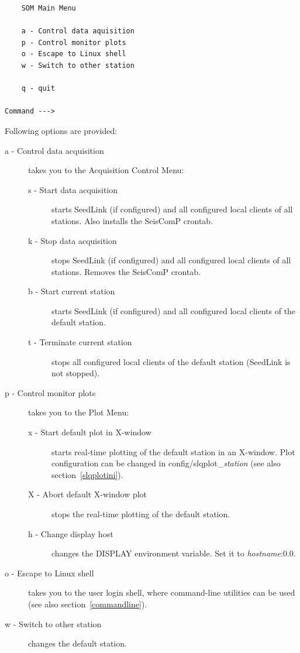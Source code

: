 \documentclass[11pt,a4paper,titlepage]{article}
\begin{document}
\begin{verbatim}
    SOM Main Menu
    
    a - Control data aquisition
    p - Control monitor plots
    o - Escape to Linux shell
    w - Switch to other station

    q - quit
    
Command --->
\end{verbatim}

Following options are provided:
\begin{description}
\item[a - Control data acquisition] takes you to the Acquisition Control Menu:

\begin{description}
\item[s - Start data acquisition] starts SeedLink (if configured) and all
configured local clients of all stations. Also installs the SeisComP crontab.

\item[k - Stop data acquisition] stops SeedLink (if configured) and all
configured local clients of all stations. Removes the SeisComP crontab.

\item[b - Start current station] starts SeedLink (if configured) and all
configured local clients of the default station.

\item[t - Terminate current station] stops all configured local
clients of the default station (SeedLink is not stopped).
\end{description}

\item[p - Control monitor plots] takes you to the Plot Menu:

\begin{description}
\item[x - Start default plot in X-window] starts real-time plotting of
the default station in an X-window. Plot configuration can be changed
in config/slqplot\_\textit{station} (see also section~\ref{slqplotini}).

\item[X - Abort default X-window plot] stops the real-time plotting of
the default station.

\item[h - Change display host] changes the DISPLAY environment variable.
Set it to \textit{hostname}:0.0.
\end{description}

\item[o - Escape to Linux shell] takes you to the user login shell, where
command-line utilities can be used (see also section~\ref{commandline}).

\item[w - Switch to other station] changes the default station.
\end{description}
\end{document}
